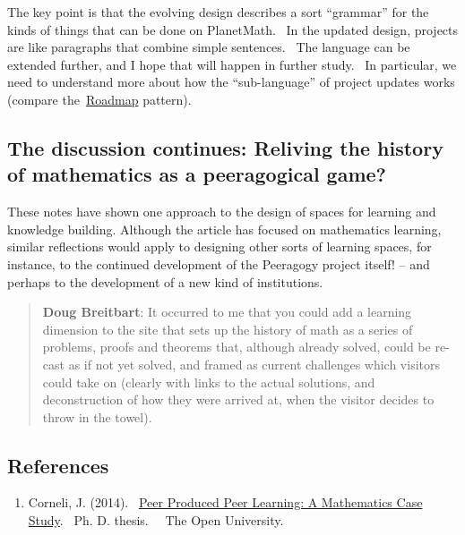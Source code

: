 The key point is that the evolving design describes a sort ``grammar''
for the kinds of things that can be done on PlanetMath.~ In the
updated design, projects are like paragraphs that combine simple
sentences.~ The language can be extended further, and I hope that will
happen in further study.~ In particular, we need to understand more
about how the ``sub-language'' of project updates works (compare
the~\href{http://peeragogy.org/practice/roadmap/}{Roadmap} pattern).

\subsection{The discussion continues: Reliving the history of
mathematics as a peeragogical game?}

These notes have shown one approach to the design of spaces for learning
and knowledge building. Although the article has focused on mathematics
learning, similar reflections would apply to designing other sorts of
learning spaces, for instance, to the continued development of the
Peeragogy project itself! -- and perhaps to the development of a new
kind of institutions.

\begin{quote}
\textbf{Doug Breitbart}: It occurred to me that you could add a learning
dimension to the site that sets up the history of math as a series of
problems, proofs and theorems that, although already solved, could be
re-cast as if not yet solved, and framed as current challenges which
visitors could take on (clearly with links to the actual solutions, and
deconstruction of how they were arrived at, when the visitor decides to
throw in the towel).
\end{quote}

\subsection{References}

\begin{enumerate}
\itemsep1pt\parskip0pt
\item
  Corneli, J. (2014).~
  \href{http://metameso.org/~joe/thesis-outline.html}{Peer Produced Peer
  Learning: A Mathematics Case Study}.~ Ph. D. thesis.~~ The
  Open University.
\end{enumerate}
